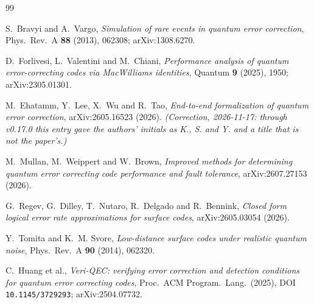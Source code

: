 \documentclass[11pt]{amsart}
\theoremstyle{plain}
\theoremstyle{definition}
\theoremstyle{remark}
\begin{document}
\begin{thebibliography}{99}
\footnotesize

S.~Bravyi and A.~Vargo,
\emph{Simulation of rare events in quantum error correction},
Phys.\ Rev.\ A \textbf{88} (2013), 062308; arXiv:1308.6270.

D.~Forlivesi, L.~Valentini and M.~Chiani,
\emph{Performance analysis of quantum error-correcting codes via MacWilliams
identities},
Quantum \textbf{9} (2025), 1950; arXiv:2305.01301.

M.~Ehatamm, Y.~Lee, X.~Wu and R.~Tao,
\emph{End-to-end formalization of quantum error correction},
arXiv:2605.16523 (2026). \emph{(Correction, 2026-11-17: through v0.17.0
this entry gave the authors' initials as K., S. and Y. and a title that is
not the paper's.)}

M.~Mullan, M.~Weippert and W.~Brown,
\emph{Improved methods for determining quantum error correcting code
performance and fault tolerance},
arXiv:2607.27153 (2026).

G.~Regev, G.~Dilley, T.~Nutaro, R.~Delgado and R.~Bennink,
\emph{Closed form logical error rate approximations for surface codes},
arXiv:2605.03054 (2026).

Y.~Tomita and K.~M. Svore,
\emph{Low-distance surface codes under realistic quantum noise},
Phys.\ Rev.\ A \textbf{90} (2014), 062320.

C.~Huang et al.,
\emph{Veri-QEC: verifying error correction and detection conditions for
quantum error correcting codes},
Proc.\ ACM Program.\ Lang.\ (2025), DOI \texttt{10.1145/3729293};
arXiv:2504.07732.

\end{thebibliography}
\end{document}
